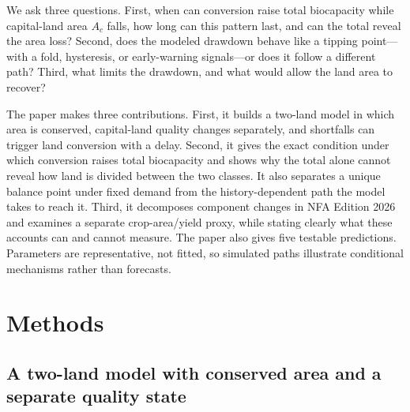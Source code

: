 \documentclass[preprint,12pt,authoryear]{elsarticle}
\begin{document}
We ask three questions. First, when can conversion raise total biocapacity while capital-land area $A_c$ falls, how long can this pattern last, and can the total reveal the area loss? Second, does the modeled drawdown behave like a tipping point—with a fold, hysteresis, or early-warning signals—or does it follow a different path? Third, what limits the drawdown, and what would allow the land area to recover?

The paper makes three contributions. First, it builds a two-land model in which area is conserved, capital-land quality changes separately, and shortfalls can trigger land conversion with a delay. Second, it gives the exact condition under which conversion raises total biocapacity and shows why the total alone cannot reveal how land is divided between the two classes. It also separates a unique balance point under fixed demand from the history-dependent path the model takes to reach it. Third, it decomposes component changes in NFA Edition 2026 and examines a separate crop-area/yield proxy, while stating clearly what these accounts can and cannot measure. The paper also gives five testable predictions. Parameters are representative, not fitted, so simulated paths illustrate conditional mechanisms rather than forecasts.\section{Methods}\label{sec:model}

\subsection{A two-land model with conserved area and a separate quality state}\label{sec:equations}
\end{document}

